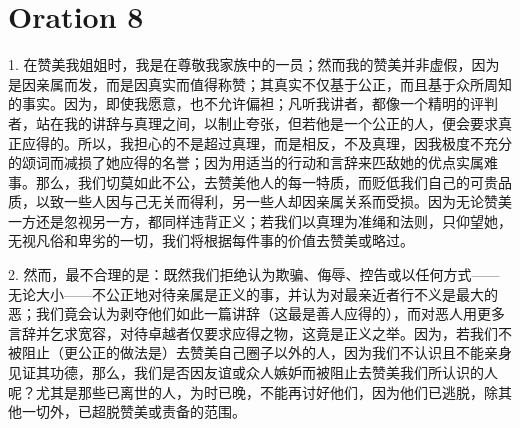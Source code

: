 
\section{Oration 8}

\par

\par

\par

1. 在赞美我姐姐时，我是在尊敬我家族中的一员；然而我的赞美并非虚假，因为是因亲属而发，而是因真实而值得称赞；其真实不仅基于公正，而且基于众所周知的事实。因为，即使我愿意，也不允许偏袒；凡听我讲者，都像一个精明的评判者，站在我的讲辞与真理之间，以制止夸张，但若他是一个公正的人，便会要求真正应得的。所以，我担心的不是超过真理，而是相反，不及真理，因我极度不充分的颂词而减损了她应得的名誉；因为用适当的行动和言辞来匹敌她的优点实属难事。那么，我们切莫如此不公，去赞美他人的每一特质，而贬低我们自己的可贵品质，以致一些人因与己无关而得利，另一些人却因亲属关系而受损。因为无论赞美一方还是忽视另一方，都同样违背正义；若我们以真理为准绳和法则，只仰望她，无视凡俗和卑劣的一切，我们将根据每件事的价值去赞美或略过。\par

2. 然而，最不合理的是：既然我们拒绝认为欺骗、侮辱、控告或以任何方式——无论大小——不公正地对待亲属是正义的事，并认为对最亲近者行不义是最大的恶；我们竟会认为剥夺他们如此一篇讲辞（这最是善人应得的），而对恶人用更多言辞并乞求宽容，对待卓越者仅要求应得之物，这竟是正义之举。因为，若我们不被阻止（更公正的做法是）去赞美自己圈子以外的人，因为我们不认识且不能亲身见证其功德，那么，我们是否因友谊或众人嫉妒而被阻止去赞美我们所认识的人呢？尤其是那些已离世的人，为时已晚，不能再讨好他们，因为他们已逃脱，除其他一切外，已超脱赞美或责备的范围。\par

